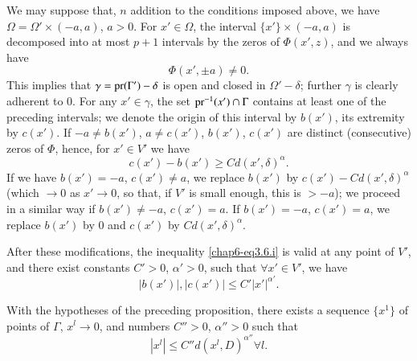 We may suppose that, $n$ addition to the conditions imposed above, we have $\Omega=\Omega'\times (-a,a)$, $a>0$. For $x'\in\Omega$, the interval $\{x'\}\times (-a,a)$ is decomposed into at most $p+1$ intervals by the zeros of $\Phi(x',z)$, and we always have
$$
\Phi (x',\pm a)\neq 0.
$$
This implies that $\gamma=\operatorname{pr}(\Gamma')-\delta$ is open and closed in $\Omega'-\delta$; further $\gamma$ is clearly adherent to $0$. For any $x'\in\gamma$, the set $\operatorname{pr}^{-1}(x')\cap \Gamma$ contains at least one of the preceding intervals; we denote the origin of this interval by $b(x')$, its extremity by $c(x')$. If $-a\neq b(x')$, $a\neq c(x')$, $b(x')$, $c(x')$ are distinct (consecutive) zeros of $\Phi$, hence, for $x'\in V'$ we have
\begin{equation*}
c(x')-b(x')\geq C d(x',\delta)^{\alpha}.\tag{3.6.i}\label{chap6-eq3.6.i}
\end{equation*}
If we have $b(x')=-a$, $c(x')\neq a$, we replace $b(x')$ by $c(x')-Cd(x',\delta)^{\alpha}$ (which $\to 0$ as $x'\to 0$, so that, if $V'$ is small enough, this is $>-a$); we proceed in a similar way if $b(x')\neq -a$, $c(x')=a$. If $b(x')=-a$, $c(x')=a$, we replace $b(x')$ by $0$ and $c(x')$ by $Cd(x',\delta)^{\alpha}$.

After these modifications, the inequality \eqref{chap6-eq3.6.i} is valid at any point of $V'$, and there exist constants $C'>0$, $\alpha'>0$, such that $\forall x'\in V'$, we have
\begin{equation*}
|b(x')|, |c(x')|\leq C'|x'|^{\alpha'}.\tag{3.6.ii}\label{chap6-eq3.6.ii}
\end{equation*}

\begin{lemma}\label{chap6-lem3.7}
With the hypotheses of the preceding proposition, there exists a sequence $\{x^{1}\}$ of points of $\Gamma$, $x^{l}\to 0$, and numbers $C''>0$, $\alpha''>0$ such that
$$
|x^{l}|\leq C'' d (x^{l},D)^{\alpha''}\forall l.
$$
\end{lemma}

